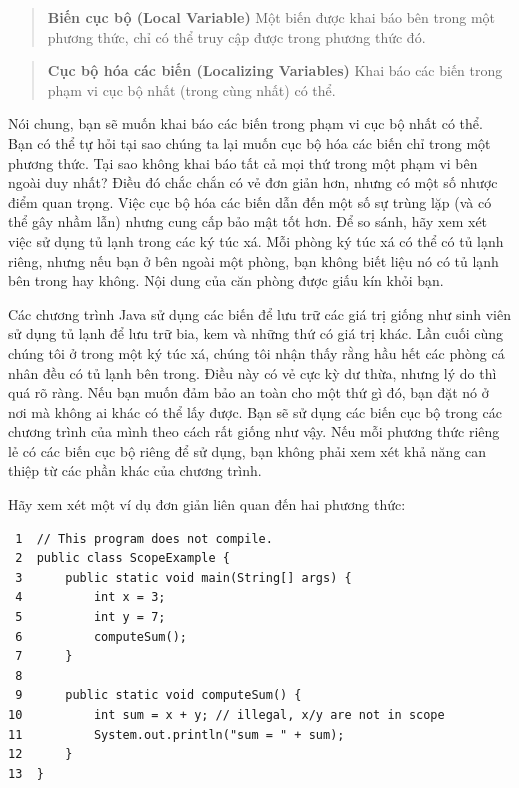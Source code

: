 \begin{quote}
\textbf{Biến cục bộ (Local Variable)} Một biến được khai báo bên trong
một phương thức, chỉ có thể truy cập được trong phương thức đó.
\end{quote}

\begin{quote}
\textbf{Cục bộ hóa các biến (Localizing Variables)} Khai báo các biến
trong phạm vi cục bộ nhất (trong cùng nhất) có thể.
\end{quote}

Nói chung, bạn sẽ muốn khai báo các biến trong phạm vi cục bộ nhất có
thể. Bạn có thể tự hỏi tại sao chúng ta lại muốn cục bộ hóa các biến chỉ
trong một phương thức. Tại sao không khai báo tất cả mọi thứ trong một
phạm vi bên ngoài duy nhất? Điều đó chắc chắn có vẻ đơn giản hơn, nhưng
có một số nhược điểm quan trọng. Việc cục bộ hóa các biến dẫn đến một số
sự trùng lặp (và có thể gây nhầm lẫn) nhưng cung cấp bảo mật tốt hơn. Để
so sánh, hãy xem xét việc sử dụng tủ lạnh trong các ký túc xá. Mỗi phòng
ký túc xá có thể có tủ lạnh riêng, nhưng nếu bạn ở bên ngoài một phòng,
bạn không biết liệu nó có tủ lạnh bên trong hay không. Nội dung của căn
phòng được giấu kín khỏi bạn.

Các chương trình Java sử dụng các biến để lưu trữ các giá trị giống như
sinh viên sử dụng tủ lạnh để lưu trữ bia, kem và những thứ có giá trị
khác. Lần cuối cùng chúng tôi ở trong một ký túc xá, chúng tôi nhận thấy
rằng hầu hết các phòng cá nhân đều có tủ lạnh bên trong. Điều này có vẻ
cực kỳ dư thừa, nhưng lý do thì quá rõ ràng. Nếu bạn muốn đảm bảo an
toàn cho một thứ gì đó, bạn đặt nó ở nơi mà không ai khác có thể lấy
được. Bạn sẽ sử dụng các biến cục bộ trong các chương trình của mình
theo cách rất giống như vậy. Nếu mỗi phương thức riêng lẻ có các biến
cục bộ riêng để sử dụng, bạn không phải xem xét khả năng can thiệp từ
các phần khác của chương trình.

Hãy xem xét một ví dụ đơn giản liên quan đến hai phương thức:

\begin{verbatim}
 1  // This program does not compile.
 2  public class ScopeExample {
 3      public static void main(String[] args) {
 4          int x = 3;
 5          int y = 7;
 6          computeSum();
 7      }
 8
 9      public static void computeSum() {
10          int sum = x + y; // illegal, x/y are not in scope
11          System.out.println("sum = " + sum);
12      }
13  }
\end{verbatim}

